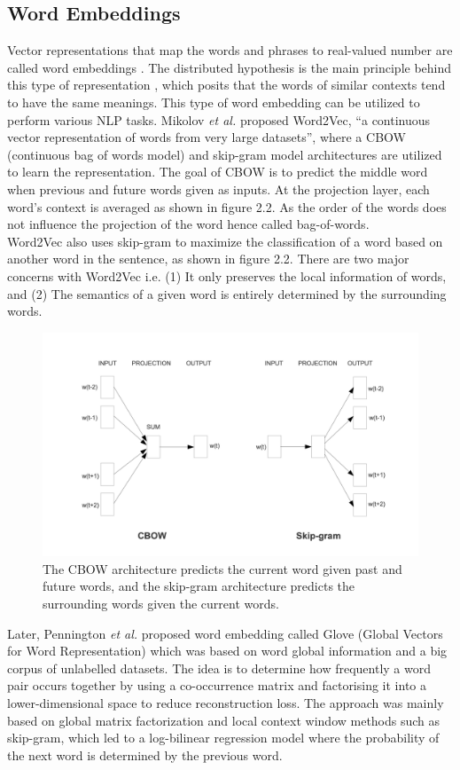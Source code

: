 \documentclass[%
	BCOR=8mm, %
	DIV=12,
	toc=bibliography, %
	toc=listof, %
	oneside, %
	egregdoesnotlikesansseriftitles, %
	]{scrbook}
\begin{document}
\subsection{Word Embeddings}
\label{subsection:wordembeddings}
Vector representations that map the words and phrases to real-valued number are called word embeddings \cite{almeida_word_2019-2}. The distributed hypothesis is the main principle behind this type of representation \cite{harris_distributional_1954}, which posits that the words of similar contexts tend to have the same meanings. This type of word embedding can be utilized to perform various NLP tasks. Mikolov \textit{et al.} \cite{mikolov_efficient_2013} proposed Word2Vec, ``a continuous vector representation of words from very large datasets'', where a CBOW (continuous bag of words model) and skip-gram model architectures are utilized to learn the representation. The goal of CBOW is to predict the middle word when previous and future words given as inputs. At the projection layer, each word's context is averaged as shown in figure 2.2. As the order of the words does not influence the projection of the word hence called bag-of-words. \\
Word2Vec also uses skip-gram to maximize the classification of a word based on another word in the  sentence, as shown in figure 2.2.  There are two major concerns with Word2Vec i.e. (1) It only preserves the local information of words,  and (2) The semantics of a given word is entirely determined by the surrounding words.
\begin{figure}[h!]
    \centering
    \includegraphics[width=0.7\linewidth]{img/cbowandskip.png}
    \caption[Working diagram of CBOW and Skip-gram.]{ The CBOW architecture predicts the current word given past and future words, and the skip-gram architecture predicts the surrounding words given the current words.}
    \label{fig:cbow}
\end{figure}
Later, Pennington \textit{et al.} \cite{pennington_glove_2014} proposed word embedding called Glove (Global Vectors for Word Representation) which was based on word global information and a big corpus of unlabelled datasets. The idea is to determine how frequently a word pair occurs together by using a co-occurrence matrix and factorising it into a lower-dimensional space to reduce reconstruction loss. The approach was mainly based on global matrix factorization and local context window methods such as skip-gram, which led to a log-bilinear regression model where the probability of the next word is determined by the previous word.\\
\end{document}
